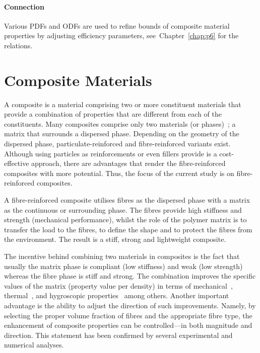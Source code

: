 \bl 
    \paragraph{Connection} Various PDFs and ODFs are used to refine bounds of composite material properties by adjusting efficiency parameters, see~Chapter~\ref{chap:p6} for the relations.


\red
\section{Composite Materials}
	A composite is a material comprising two or more constituent materials that provide a combination of properties that are different from each of the constituents. Many composites comprise only two materials (or phases)~\autocite{Callister.2018}; a matrix that surrounds a dispersed phase. Depending on the geometry of the dispersed phase, particulate-reinforced and fibre-reinforced variants exist. Although using particles as reinforcements or even fillers provide is a cost-effective approach, there are advantages that render the fibre-reinforced composites with more potential. Thus, the focus of the current study is on fibre-reinforced composites.
	
	A fibre-reinforced composite utilises fibres as the dispersed phase with a matrix as the continuous or surrounding phase. The fibres provide high stiffness and strength (mechanical performance), whilst the role of the polymer matrix is to transfer the load to the fibres, to define the shape and to protect the fibres from the environment. The result is a stiff, strong and lightweight composite. 

	The incentive behind combining two materials in composites is the fact that usually the matrix phase is compliant (low stiffness) and weak (low strength) whereas the fibre phase is stiff and strong. The combination improves the specific values of the matrix (property value per density) in terms of mechanical~, thermal~\autocite{Javanbakht.2016b,Javanbakht.2016,Javanbakht.2017d}, and hygroscopic properties~\autocite{Javanbakht.2018} among others. Another important advantage is the ability to adjust the direction of such improvements. Namely, by selecting the proper volume fraction of fibres and the appropriate fibre type, the enhancement of composite properties can be controlled---in both magnitude and direction. This statement has been confirmed by several experimental and numerical analyses.
		
